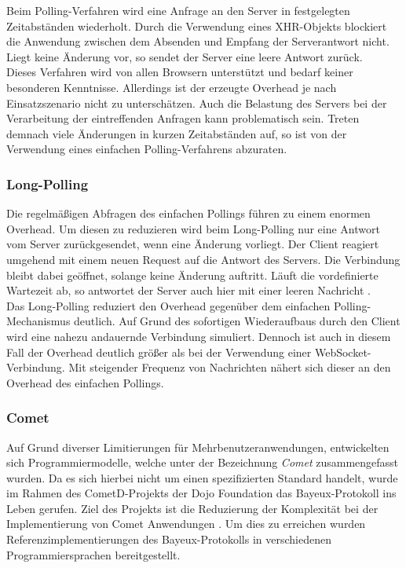 \documentclass[11pt,a4paper,titlepage]{scrartcl}
\numberwithin{equation}{section}
\begin{document}
\noindent Beim Polling-Verfahren wird eine Anfrage an den Server in festgelegten Zeitabständen wiederholt. Durch die Verwendung eines XHR-Objekts blockiert die Anwendung zwischen dem Absenden und Empfang der Serverantwort nicht. Liegt keine Änderung vor, so sendet der Server eine leere Antwort zurück. \\

\noindent Dieses Verfahren wird von allen Browsern unterstützt und bedarf keiner besonderen Kenntnisse. Allerdings ist der erzeugte Overhead je nach Einsatzszenario nicht zu unterschätzen. Auch die Belastung des Servers bei der Verarbeitung der eintreffenden Anfragen kann problematisch sein. Treten demnach viele Änderungen in kurzen Zeitabständen auf, so ist von der Verwendung eines einfachen Polling-Verfahrens abzuraten.

\subsubsection{Long-Polling}\label{subsubsec:Long-Polling}
Die regelmäßigen Abfragen des einfachen Pollings führen zu einem enormen Overhead. Um diesen zu reduzieren wird beim Long-Polling nur eine Antwort vom Server zurückgesendet, wenn eine Änderung vorliegt. Der Client reagiert umgehend mit einem neuen Request auf die Antwort des Servers. Die Verbindung bleibt dabei geöffnet, solange keine Änderung auftritt. Läuft die vordefinierte Wartezeit ab, so antwortet der Server auch hier mit einer leeren Nachricht \autocite[29]{gorski_websockets_2015}. \\

\noindent Das Long-Polling reduziert den Overhead gegenüber dem einfachen Polling-Mechanismus deutlich. Auf Grund des sofortigen Wiederaufbaus durch den Client wird eine nahezu andauernde Verbindung simuliert. Dennoch ist auch in diesem Fall der Overhead deutlich größer als bei der Verwendung einer WebSocket-Verbindung. Mit steigender Frequenz von Nachrichten nähert sich dieser an den Overhead des einfachen Pollings.

\subsubsection{Comet}\label{subsubsec:Comet}
Auf Grund diverser Limitierungen für Mehrbenutzeranwendungen, entwickelten sich Programmiermodelle, welche unter der Bezeichnung \textit{Comet} \autocite{russell_comet_2006} zusammengefasst wurden. Da es sich hierbei nicht um einen spezifizierten Standard handelt, wurde im Rahmen des CometD-Projekts der Dojo Foundation das Bayeux-Protokoll ins Leben gerufen. Ziel des Projekts ist die Reduzierung der Komplexität bei der Implementierung von Comet Anwendungen \autocite{russell_cometd_2007}. Um dies zu erreichen wurden Referenzimplementierungen des Bayeux-Protokolls in verschiedenen Programmiersprachen bereitgestellt. \\
\end{document}

